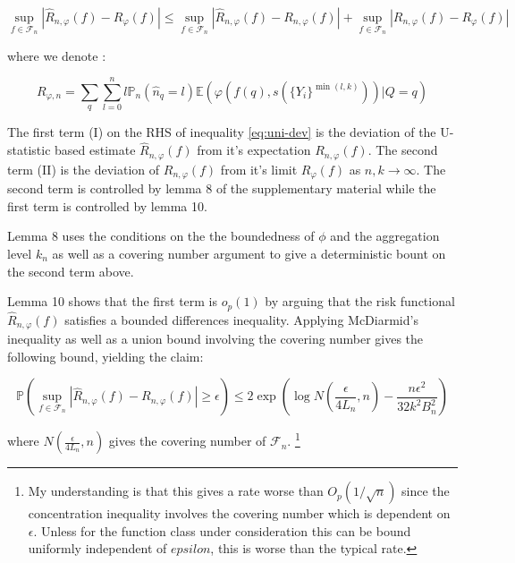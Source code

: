 \documentclass[a4paper,10pt]{article}
\begin{document}
\begin{equation} \label{eq:uni-dev}
  \sup_{f \in \mathcal{F}_n} \left| \hat{R}_{n, \varphi}(f) - R_\varphi(f) \right| \leq
  \sup_{f \in \mathcal{F}_n} \left| \hat{R}_{n, \varphi}(f) - R_{n, \varphi}(f) \right| +
  \sup_{f \in \mathcal{F}_n} \left| R_{n, \varphi}(f) - R_{\varphi}(f) \right|
\end{equation}

where we denote :

\begin{equation}
  R_{\varphi, n} = \sum_q\sum_{l=0}^n l \mathbb{P}_n(\hat{n}_q = l) \mathbb{E}(\varphi(f(q), s(\{Y_i\}^{\min(l, k)}))|Q=q)
\end{equation}

The first term (I) on the RHS of inequality \ref{eq:uni-dev} is the deviation of the U-statistic based estimate \(\hat{R}_{n, \varphi}(f)\) from it's expectation \(R_{n, \varphi}(f)\). The second term (II) is the deviation of \(R_{n, \varphi}(f)\) from it's limit \(R_{\varphi}(f)\) as \(n, k \rightarrow \infty\). The second term is controlled by lemma 8 of the supplementary material \cite{duchi-2013-ranking} while the first term is controlled by lemma 10.

Lemma 8 uses the conditions on the the boundedness of \(\phi\) and the aggregation level \(k_n\) as well as a covering number argument to give a deterministic bount on the second term above.

Lemma 10 shows that the first term is \(o_p(1)\) by arguing that the risk functional \(\hat{R}_{n, \varphi}(f)\) satisfies a bounded differences inequality. Applying McDiarmid's inequality as well as a union bound involving the covering number gives the following bound, yielding the claim:

\begin{equation}
  \mathbb{P}\left( \sup_{f \in \mathcal{F}_n} \left| \hat{R}_{n, \varphi}(f) - R_{n, \varphi}(f) \right| \geq \epsilon \right) \leq 2\exp\left( \log N \left( \frac{\epsilon}{4L_n}, n \right) - \frac{n \epsilon^2}{32k^2B_n^2} \right)
\end{equation}

where \(N \left( \frac{\epsilon}{4L_n}, n \right)\) gives the covering number of \(\mathcal{F}_n\).
\footnote{My understanding is that this gives a rate worse than \(O_p(1/\sqrt n)\) since the concentration inequality involves the covering number which is dependent on \(\epsilon\). Unless for the function class under consideration this can be bound uniformly independent of \(epsilon\), this is worse than the typical rate.}
\end{document}
